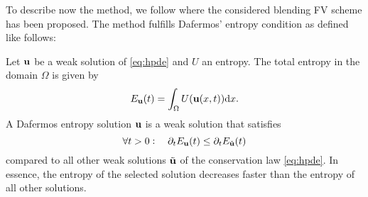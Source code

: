%
To describe now the method, we follow  \cite{klein2021using} where the considered blending FV scheme has been proposed. The method  fulfills  Dafermos' entropy condition   \cite{dafermos1973entropy} as defined like follows: 
\begin{definition}\label{def_Dafermos}
Let $\mathbf{u}$ be a weak solution of \eqref{eq:hpde} and $U$ an entropy. The total entropy in the domain  $\Omega$ is given by 
\[
E_{\mathbf{u}}(t) = \int_{\Omega} U( \mathbf{u}(x, t)) \mathrm{d} x.
\]
A Dafermos entropy solution $\mathbf{u}$ is a weak solution that satisfies 
\begin{equation}\label{eq_Dafermos}
 \forall t > 0: \quad \partial_t E_{\mathbf{u}}(t) \leq \partial_t E_{\tilde{\mathbf{u}}}(t) 
\end{equation}
compared to all other weak solutions $\tilde {\mathbf{u}}$ of the conservation law \eqref{eq:hpde}. In essence, the entropy of the selected solution decreases faster than the entropy of all other solutions.
\end{definition}

